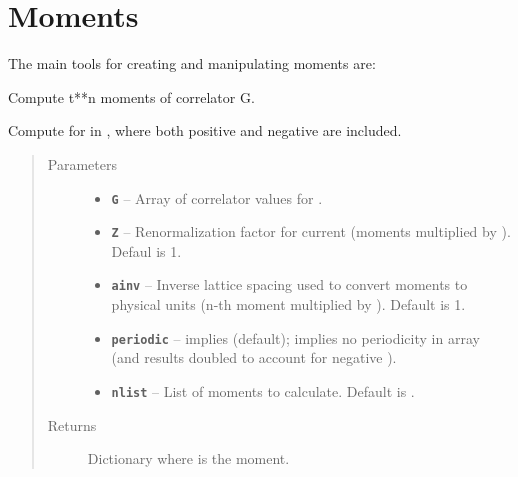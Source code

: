 \documentclass[letterpaper,10pt,english]{sphinxmanual}
\begin{document}
\section{Moments}
\label{g2tools:moments}
The main tools for creating and manipulating moments are:

\begin{fulllineitems}
\label{g2tools:g2tools.moments}
Compute t**n moments of correlator G.

Compute  for  in , where both positive and
negative  are included.
\begin{quote}\begin{description}
\item[{Parameters}] \leavevmode\begin{itemize}
\item {} 
\textbf{\texttt{G}} -- Array of correlator values  for .

\item {} 
\textbf{\texttt{Z}} -- Renormalization factor for current (moments multiplied by ).
Defaul is 1.

\item {} 
\textbf{\texttt{ainv}} -- Inverse lattice spacing used to convert moments to
physical units (n-th moment multiplied by ).
Default is 1.

\item {} 
\textbf{\texttt{periodic}} --  implies  (default);
 implies no periodicity in array 
(and results doubled to account for negative ).

\item {} 
\textbf{\texttt{nlist}} -- List of moments to calculate. Default is
.

\end{itemize}

\item[{Returns}] \leavevmode
Dictionary  where  is the  moment.

\end{description}\end{quote}

\end{fulllineitems}
\end{document}
